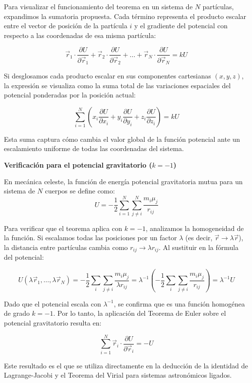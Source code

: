 \documentclass[a4paper]{article}
\begin{document}
Para visualizar el funcionamiento del teorema en un sistema de $N$ partículas, expandimos la sumatoria propuesta. Cada término representa el producto escalar entre el vector de posición de la partícula $i$ y el gradiente del potencial con respecto a las coordenadas de esa misma partícula:

$$ \vec{r}_1 \cdot \frac{\partial U}{\partial \vec{r}_1} + \vec{r}_2 \cdot \frac{\partial U}{\partial \vec{r}_2} + \dots + \vec{r}_N \cdot \frac{\partial U}{\partial \vec{r}_N} = k U $$

Si desglosamos cada producto escalar en sus componentes cartesianas $(x, y, z)$, la expresión se visualiza como la suma total de las variaciones espaciales del potencial ponderadas por la posición actual:

$$ \sum_{i=1}^N \left( x_i \frac{\partial U}{\partial x_i} + y_i \frac{\partial U}{\partial y_i} + z_i \frac{\partial U}{\partial z_i} \right) = k U $$

Esta suma captura cómo cambia el valor global de la función potencial ante un escalamiento uniforme de todas las coordenadas del sistema.

\textbf{Verificación para el potencial gravitatorio ($k = -1$)}

En mecánica celeste, la función de energía potencial gravitatoria mutua para un sistema de $N$ cuerpos se define como:
$$ U = -\frac{1}{2} \sum_{i=1}^N \sum_{j \neq i}^N \frac{m_i \mu_j}{r_{ij}} $$

Para verificar que el teorema aplica con $k = -1$, analizamos la homogeneidad de la función. Si escalamos todas las posiciones por un factor $\lambda$ (es decir, $\vec{r} \to \lambda \vec{r}$), la distancia entre partículas cambia como $r_{ij} \to \lambda r_{ij}$. Al sustituir en la fórmula del potencial:

$$ U(\lambda \vec{r}_1, \dots, \lambda \vec{r}_N) = -\frac{1}{2} \sum_{i} \sum_{j \neq i} \frac{m_i \mu_j}{\lambda r_{ij}} = \lambda^{-1} \left( -\frac{1}{2} \sum_{i} \sum_{j \neq i} \frac{m_i \mu_j}{r_{ij}} \right) = \lambda^{-1} U $$

Dado que el potencial escala con $\lambda^{-1}$, se confirma que es una función homogénea de grado $k = -1$. Por lo tanto, la aplicación del Teorema de Euler sobre el potencial gravitatorio resulta en:

$$ \sum_{i=1}^N \vec{r}_i \cdot \frac{\partial U}{\partial \vec{r}_i} = -U $$

Este resultado es el que se utiliza directamente en la deducción de la identidad de Lagrange-Jacobi y el Teorema del Virial para sistemas astronómicos ligados.
\end{document}
